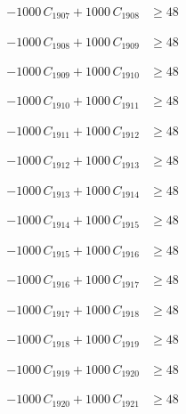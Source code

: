 \documentclass[a4paper,11pt]{article}
\begin{document}
\begin{align}
-1000\,C_{1907} + 1000\,C_{1908} &\geq 48 \nonumber
\end{align}

\begin{align}
-1000\,C_{1908} + 1000\,C_{1909} &\geq 48 \nonumber
\end{align}

\begin{align}
-1000\,C_{1909} + 1000\,C_{1910} &\geq 48 \nonumber
\end{align}

\begin{align}
-1000\,C_{1910} + 1000\,C_{1911} &\geq 48 \nonumber
\end{align}

\begin{align}
-1000\,C_{1911} + 1000\,C_{1912} &\geq 48 \nonumber
\end{align}

\begin{align}
-1000\,C_{1912} + 1000\,C_{1913} &\geq 48 \nonumber
\end{align}

\begin{align}
-1000\,C_{1913} + 1000\,C_{1914} &\geq 48 \nonumber
\end{align}

\begin{align}
-1000\,C_{1914} + 1000\,C_{1915} &\geq 48 \nonumber
\end{align}

\begin{align}
-1000\,C_{1915} + 1000\,C_{1916} &\geq 48 \nonumber
\end{align}

\begin{align}
-1000\,C_{1916} + 1000\,C_{1917} &\geq 48 \nonumber
\end{align}

\begin{align}
-1000\,C_{1917} + 1000\,C_{1918} &\geq 48 \nonumber
\end{align}

\begin{align}
-1000\,C_{1918} + 1000\,C_{1919} &\geq 48 \nonumber
\end{align}

\begin{align}
-1000\,C_{1919} + 1000\,C_{1920} &\geq 48 \nonumber
\end{align}

\begin{align}
-1000\,C_{1920} + 1000\,C_{1921} &\geq 48 \nonumber
\end{align}
\end{document}

